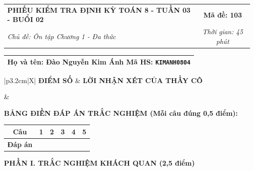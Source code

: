 \documentclass[12pt,a4paper]{article}
\begin{document}
\newpage


\noindent
\begin{tabularx}{\linewidth}{|X|c|}
\hline
\textbf{PHIẾU KIỂM TRA ĐỊNH KỲ TOÁN 8 - TUẦN 03 - BUỔI 02} & \textbf{Mã đề: 103} \\
\textit{Chủ đề: Ôn tập Chương 1 - Đa thức} & \textit{Thời gian: 45 phút} \\
\hline
\end{tabularx}

\vspace{1mm}

\noindent
\begin{tabularx}{\linewidth}{|X|}
\hline
\rule[-2mm]{0pt}{7.5mm}\textbf{Họ và tên:} \textbf{\large Đào Nguyễn Kim Ánh} \hfill \textbf{Mã HS:} \texttt{KIMANH0804} \quad \\
\hline
\end{tabularx}

\vspace{1mm}

\noindent
\begin{tabularx}{\linewidth}{|p{3.2cm}|X|}
\hline
\centering\textbf{ĐIỂM SỐ} & \centering\textbf{LỜI NHẬN XÉT CỦA THẦY CÔ} \tabularnewline
\hline
\rule{0pt}{1.3cm} & \tabularnewline
\hline
\end{tabularx}

\vspace{1.2mm}

\noindent\textbf{BẢNG ĐIỀN ĐÁP ÁN TRẮC NGHIỆM (Mỗi câu đúng 0,5 điểm):}
\vspace{0.8mm}

\noindent
\renewcommand{\arraystretch}{1.35}
\begin{tabularx}{\linewidth}{|c|*{5}{>{\centering\arraybackslash}X|}}
\hline
\textbf{Câu} & \textbf{1} & \textbf{2} & \textbf{3} & \textbf{4} & \textbf{5} \\
\hline
\textbf{Đáp án} & & & & & \\
\hline
\end{tabularx}
\renewcommand{\arraystretch}{1.0}

\vspace{1.5mm}

\noindent\textbf{\large PHẦN I. TRẮC NGHIỆM KHÁCH QUAN (2,5 điểm)}
\vspace{1mm}
\end{document}
